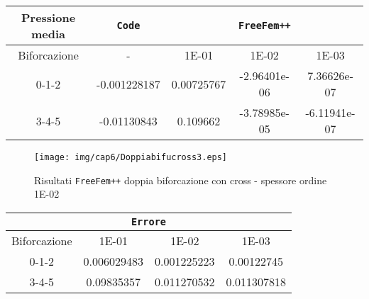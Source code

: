 \begin{center}
\begin{tabular}{|c|c|c|c|c|}
\hline
 Pressione media & \textbf{\texttt{Code}} & \multicolumn{3}{|c|}{\textbf{\texttt{FreeFem++}}} \\ 
\hline
\multicolumn{1}{|c|}{Biforcazione} & - &
\multicolumn{1}{|c|}{1E-01} & 1E-02 & 1E-03 \\
\hline
  0-1-2 & -0.001228187 & 0.00725767 & -2.96401e-06 & 7.36626e-07 \\
  3-4-5 & -0.01130843 & 0.109662 & -3.78985e-05 & -6.11941e-07 \\
\hline
\end{tabular}
\end{center}

\begin{center}
\begin{figure}[h!]
\centering
\texttt{[image: img/cap6/Doppiabifucross3.eps]}
\caption{Risultati \texttt{FreeFem++} doppia biforcazione con cross - spessore ordine 1E-02 }\label{DoppiaBifuCross1E-02}
\end{figure}
\end{center}

\begin{center}
\begin{tabular}{|c|c|c|c|}
\hline
  \multicolumn{4}{|c|}{\textbf{\texttt{Errore}}} \\ 
\hline
\multicolumn{1}{|c|}{Biforcazione} &
\multicolumn{1}{|c|}{1E-01} & 1E-02 & 1E-03 \\
\hline
  0-1-2 &  0.006029483 & 0.001225223 & 0.00122745 \\
  3-4-5 & 0.09835357 & 0.011270532 & 0.011307818 \\
\hline
\end{tabular}
\end{center}